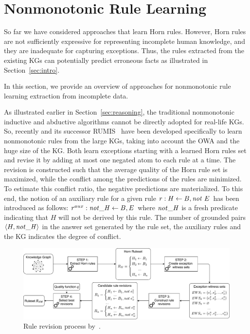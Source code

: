 \section{Nonmonotonic Rule Learning}\label{sec:nmrulelearn}
So far we have considered approaches that learn Horn rules. However,  Horn rules are not sufficiently expressive for representing incomplete human knowledge, and they are inadequate for capturing
exceptions. Thus, the rules extracted from the existing KGs can potentially %
predict erroneous facts as illustrated in Section~\ref{sec:intro}. 

In this section, we provide an overview of approaches for nonmonotonic rule learning extraction from incomplete data. 

As illustrated earlier in Section~\ref{sec:reasoning}, the traditional nonmonotonic inductive and abductive algorithms cannot be directly adopted for real-life KGs. So, recently \cite{gad2016} and its successor RUMIS~\cite{rumis} have been developed specifically to learn nonmonotonic rules from the large KGs, taking into account the OWA and the huge size of the KG. Both %
learn exceptions starting with a learned Horn rules set and revise it by  
adding at most one negated atom to each rule at a time. The revision is constructed such that the average quality of the Horn rule set is maximized, while the conflict among the predictions of the rules are minimized. To estimate this conflict ratio, the negative predictions are materialized. To this end, %
the notion of an auxiliary rule for a given rule $r:H \leftarrow B, \mathit{not}~ E$ has been introduced as follows: %
$r^{aux}:\mathit{not\_H} \leftarrow B, E$ where $\mathit{not\_H}$ is a fresh predicate indicating that $H$ will not be derived by this rule. The number of grounded pairs $\langle H,\mathit{not\_H}\rangle$ in the answer set generated by the rule set, the auxiliary rules and the KG indicates the degree of conflict.

\begin{figure}[t]
\centering
\includegraphics[width=1\textwidth]{figures/overview_new}
\caption{Rule revision process by~\cite{gad2016,rumis}.}
\label{fig:iswc_process}
\end{figure}


